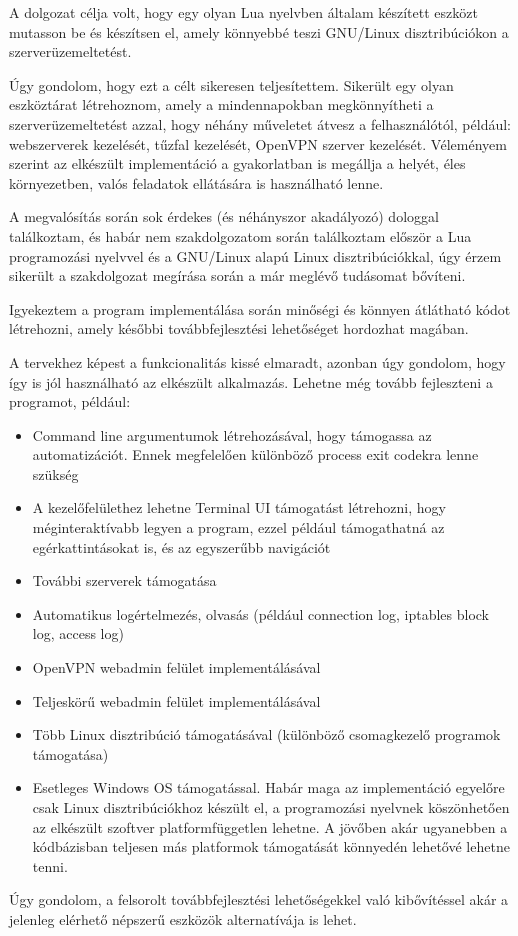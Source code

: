 
A dolgozat célja volt, hogy egy olyan Lua nyelvben általam készített eszközt mutasson be és készítsen el, amely könnyebbé teszi GNU/Linux disztribúciókon a szerverüzemeltetést.

Úgy gondolom, hogy ezt a célt sikeresen teljesítettem. Sikerült egy olyan eszköztárat létrehoznom, amely a mindennapokban megkönnyítheti a szerverüzemeltetést azzal, hogy néhány műveletet átvesz a felhasználótól, például: webszerverek kezelését, tűzfal kezelését, OpenVPN szerver kezelését. Véleményem szerint az elkészült implementáció a gyakorlatban is megállja a helyét, éles környezetben, valós feladatok ellátására is használható lenne.

A megvalósítás során sok érdekes (és néhányszor akadályozó) dologgal találkoztam, és habár nem szakdolgozatom során találkoztam először a Lua programozási nyelvvel és a GNU/Linux alapú Linux disztribúciókkal, úgy érzem sikerült a szakdolgozat megírása során a már meglévő tudásomat bővíteni.

Igyekeztem a program implementálása során minőségi és könnyen átlátható kódot létrehozni, amely későbbi továbbfejlesztési lehetőséget hordozhat magában.

A tervekhez képest a funkcionalitás kissé elmaradt, azonban úgy gondolom, hogy így is jól használható az elkészült alkalmazás. Lehetne még tovább fejleszteni a programot, például:
\begin{itemize}
	\item Command line argumentumok létrehozásával, hogy támogassa az automatizációt. Ennek megfelelően különböző process exit codekra lenne szükség
	\item A kezelőfelülethez lehetne Terminal UI támogatást létrehozni, hogy méginteraktívabb legyen a program, ezzel például támogathatná az egérkattintásokat is, és az egyszerűbb navigációt
	\item További szerverek támogatása
	\item Automatikus logértelmezés, olvasás (például connection log, iptables block log, access log)
	\item OpenVPN webadmin felület implementálásával
	\item Teljeskörű webadmin felület implementálásával
	\item Több Linux disztribúció támogatásával (különböző csomagkezelő programok támogatása)
	\item Esetleges Windows OS támogatással. Habár maga az implementáció egyelőre csak Linux disztribúciókhoz készült el, a programozási nyelvnek köszönhetően az elkészült szoftver platformfüggetlen lehetne. A jövőben akár ugyanebben a kódbázisban teljesen más platformok támogatását könnyedén lehetővé lehetne tenni.
\end{itemize}

Úgy gondolom, a felsorolt továbbfejlesztési lehetőségekkel való kibővítéssel akár a jelenleg elérhető népszerű eszközök alternatívája is lehet.